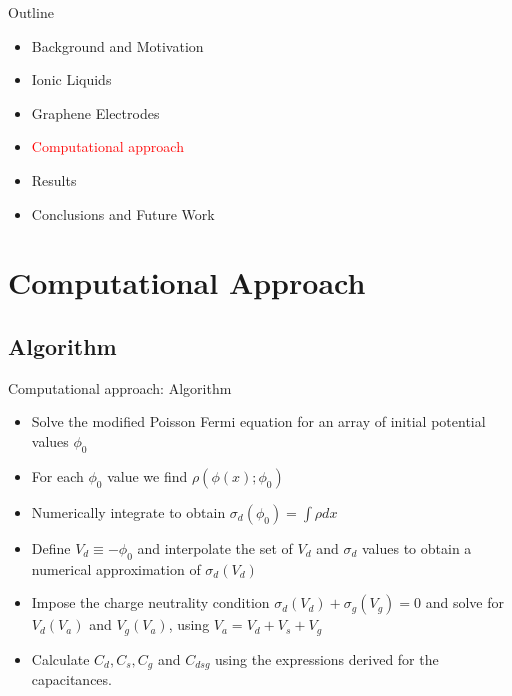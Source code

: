 \documentclass{beamer}
\begin{document}
\begin{frame}{Outline}

\begin{itemize}
\item Background and Motivation\\
\item Ionic Liquids\\
\item Graphene Electrodes\\
\item \textcolor{red}{Computational approach} \\
\item Results \\
\item Conclusions and Future Work
\end{itemize}
\end{frame}

\section{Computational Approach}
\subsection{Algorithm}
\begin{frame}{Computational approach: Algorithm}
\begin{itemize}
    \item Solve the modified Poisson Fermi equation for an array of initial potential values $\phi_0$ 
    \item For each $\phi_0$ value we find $\rho(\phi(x);\phi_0)$
    \item Numerically integrate to obtain $\sigma_d(\phi_0) = \int \rho dx$
    \item Define $V_d \equiv - \phi_0$ and interpolate the set of $V_d$ and $\sigma_d$ values to obtain a numerical approximation of $\sigma_d(V_d)$
    \item Impose the charge neutrality condition $\sigma_d(V_d) + \sigma_g(V_g) = 0 $ and solve for $V_d(V_a)$ and $V_g(V_a)$, using $V_a = V_d + V_s +V_g$
    \item Calculate $C_d , C_s, C_g$ and $C_{dsg}$ using the expressions derived for the capacitances.
\end{itemize}
\end{frame}
\end{document}
